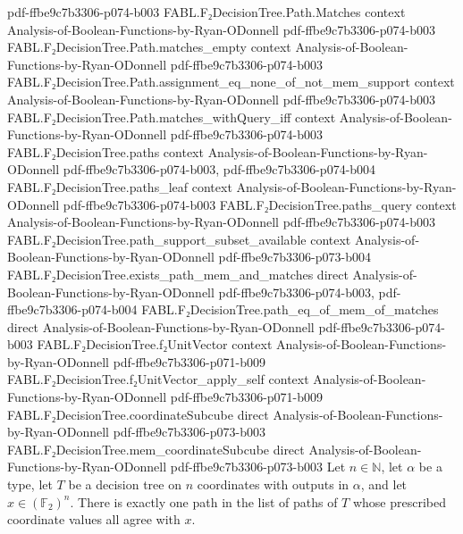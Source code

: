 \begin{theorem}
  {pdf-ffbe9c7b3306-p074-b003}
\proofstep
  {FABL.F₂DecisionTree.Path.Matches}
  {context}
  {Analysis-of-Boolean-Functions-by-Ryan-ODonnell}
  {pdf-ffbe9c7b3306-p074-b003}
\proofstep
  {FABL.F₂DecisionTree.Path.matches_empty}
  {context}
  {Analysis-of-Boolean-Functions-by-Ryan-ODonnell}
  {pdf-ffbe9c7b3306-p074-b003}
\proofstep
  {FABL.F₂DecisionTree.Path.assignment_eq_none_of_not_mem_support}
  {context}
  {Analysis-of-Boolean-Functions-by-Ryan-ODonnell}
  {pdf-ffbe9c7b3306-p074-b003}
\proofstep
  {FABL.F₂DecisionTree.Path.matches_withQuery_iff}
  {context}
  {Analysis-of-Boolean-Functions-by-Ryan-ODonnell}
  {pdf-ffbe9c7b3306-p074-b003}
\proofstep
  {FABL.F₂DecisionTree.paths}
  {context}
  {Analysis-of-Boolean-Functions-by-Ryan-ODonnell}
  {pdf-ffbe9c7b3306-p074-b003,
    pdf-ffbe9c7b3306-p074-b004}
\proofstep
  {FABL.F₂DecisionTree.paths_leaf}
  {context}
  {Analysis-of-Boolean-Functions-by-Ryan-ODonnell}
  {pdf-ffbe9c7b3306-p074-b003}
\proofstep
  {FABL.F₂DecisionTree.paths_query}
  {context}
  {Analysis-of-Boolean-Functions-by-Ryan-ODonnell}
  {pdf-ffbe9c7b3306-p074-b003}
\proofstep
  {FABL.F₂DecisionTree.path_support_subset_available}
  {context}
  {Analysis-of-Boolean-Functions-by-Ryan-ODonnell}
  {pdf-ffbe9c7b3306-p073-b004}
\proofstep
  {FABL.F₂DecisionTree.exists_path_mem_and_matches}
  {direct}
  {Analysis-of-Boolean-Functions-by-Ryan-ODonnell}
  {pdf-ffbe9c7b3306-p074-b003,
    pdf-ffbe9c7b3306-p074-b004}
\proofstep
  {FABL.F₂DecisionTree.path_eq_of_mem_of_matches}
  {direct}
  {Analysis-of-Boolean-Functions-by-Ryan-ODonnell}
  {pdf-ffbe9c7b3306-p074-b003}
\proofstep
  {FABL.F₂DecisionTree.f₂UnitVector}
  {context}
  {Analysis-of-Boolean-Functions-by-Ryan-ODonnell}
  {pdf-ffbe9c7b3306-p071-b009}
\proofstep
  {FABL.F₂DecisionTree.f₂UnitVector_apply_self}
  {context}
  {Analysis-of-Boolean-Functions-by-Ryan-ODonnell}
  {pdf-ffbe9c7b3306-p071-b009}
\proofstep
  {FABL.F₂DecisionTree.coordinateSubcube}
  {direct}
  {Analysis-of-Boolean-Functions-by-Ryan-ODonnell}
  {pdf-ffbe9c7b3306-p073-b003}
\proofstep
  {FABL.F₂DecisionTree.mem_coordinateSubcube}
  {direct}
  {Analysis-of-Boolean-Functions-by-Ryan-ODonnell}
  {pdf-ffbe9c7b3306-p073-b003}
Let $n\in\mathbb{N}$, let $\alpha$ be a type, let $T$ be a decision tree on $n$
coordinates with outputs in $\alpha$, and let $x\in(\mathbb{F}_2)^n$. There is exactly
one path in the list of paths of $T$ whose prescribed coordinate values all agree with
$x$.
\end{theorem}

